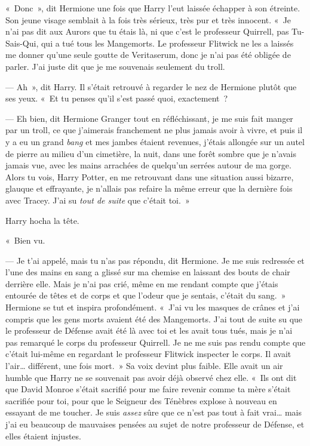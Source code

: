 «~Donc~», dit Hermione une fois que Harry l'eut laissée échapper à son étreinte.
Son jeune visage semblait à la fois très sérieux, très pur et très innocent.
«~Je n'ai pas dit aux Aurors que tu étais là, ni que c'est le professeur Quirrell, pas Tu-Sais-Qui, qui a tué tous les Mangemorts.
Le professeur Flitwick ne les a laissés me donner qu'une seule goutte de Veritaserum, donc je n'ai pas été obligée de parler.
J'ai juste dit que je me souvenais seulement du troll.

--- Ah~», dit Harry.
Il s'était retrouvé à regarder le nez de Hermione plutôt que ses yeux.
«~Et tu penses qu'il s'est passé quoi, exactement~?

--- Eh bien, dit Hermione Granger tout en réfléchissant, je me suis fait manger par un troll, ce que j'aimerais franchement ne plus jamais avoir à vivre, et puis il y a eu un grand \emph{bang} et mes jambes étaient revenues, j'étais allongée sur un autel de pierre au milieu d'un cimetière, la nuit, dans une forêt sombre que je n'avais jamais vue, avec les mains arrachées de quelqu'un serrées autour de ma gorge.
Alors tu vois, Harry Potter, en me retrouvant dans une situation aussi bizarre, glauque et effrayante, je n'allais pas refaire la même erreur que la dernière fois avec Tracey.
J'ai su \emph{tout de suite} que c'était toi.~»

Harry hocha la tête.

«~Bien vu.

--- Je t'ai appelé, mais tu n'as pas répondu, dit Hermione.
Je me suis redressée et l'une des mains en sang a glissé sur ma chemise en laissant des bouts de chair derrière elle.
Mais je n'ai pas crié, même en me rendant compte que j'étais entourée de têtes et de corps et que l'odeur que je sentais, c'était du sang.~»
Hermione se tut et inspira profondément.
«~J'ai vu les masques de crânes et j'ai compris que les gens morts avaient été des Mangemorts.
J'ai tout de suite su que le professeur de Défense avait été là avec toi et les avait tous tués, mais je n'ai pas remarqué le corps du professeur Quirrell.
Je ne me suis pas rendu compte que c'était lui-même en regardant le professeur Flitwick inspecter le corps.
Il avait l'air… différent, une fois mort.~»
Sa voix devint plus faible.
Elle avait un air humble que Harry ne se souvenait pas avoir déjà observé chez elle.
«~Ils ont dit que David Monroe s'était sacrifié pour me faire revenir comme ta mère s'était sacrifiée pour toi, pour que le Seigneur des Ténèbres explose à nouveau en essayant de me toucher.
Je suis \emph{assez} sûre que ce n'est pas tout à fait vrai… mais j'ai eu beaucoup de mauvaises pensées au sujet de notre professeur de Défense, et elles étaient injustes.

